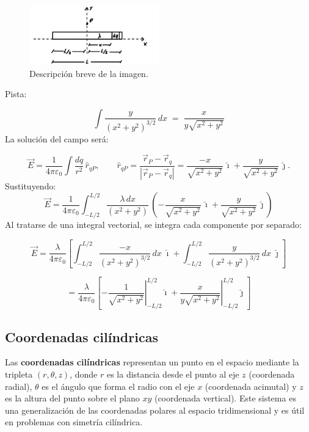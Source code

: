 \documentclass[a4paper,12pt]{article}
\begin{document}
\begin{figure}[h]
  \centering
  \includegraphics[width=0.5\textwidth]{imagen_4.jpeg}
  \caption{Descripción breve de la imagen.}
  \label{fig:imagen4}
\end{figure}

\noindent Pista: 

\[
\int \frac{y}{(x^2+y^2)^{3/2}}\,dx \;=\; \frac{x}{y\sqrt{x^2+y^2}}
\]
La solución del campo será:

\[
\vec E = \frac{1}{4\pi\varepsilon_0} \int \frac{dq}{r^2}\,\hat r_{qP},
\qquad
\hat r_{qP} = \frac{\vec r_P-\vec r_q}{|\vec r_P-\vec r_q|}
= \frac{-x}{\sqrt{x^2+y^2}}\,\hat{\imath} + \frac{y}{\sqrt{x^2+y^2}}\,\hat{\jmath}.
\]
Sustituyendo:
\[
\vec E = \frac{1}{4\pi\varepsilon_0} \int_{-L/2}^{L/2}
\frac{\lambda\,dx}{(x^2+y^2)}\,
\left( -\frac{x}{\sqrt{x^2+y^2}}\,\hat{\imath}
+ \frac{y}{\sqrt{x^2+y^2}}\,\hat{\jmath} \right)
\]
Al tratarse de una integral vectorial, se integra cada componente por separado:

\[
\vec E =
\frac{\lambda}{4\pi\varepsilon_0} \left[
\int_{-L/2}^{L/2} \frac{-x}{(x^2+y^2)^{3/2}}\,dx \;\hat{\imath}
+ \int_{-L/2}^{L/2} \frac{y}{(x^2+y^2)^{3/2}}\,dx \;\hat{\jmath}
\right]
\]

\[
= \frac{\lambda}{4\pi\varepsilon_0} \left[
\left. -\frac{1}{\sqrt{x^2+y^2}} \right|_{-L/2}^{L/2} \hat{\imath}
+ \left. \frac{x}{y\sqrt{x^2+y^2}} \right|_{-L/2}^{L/2} \hat{\jmath}
\right]
\]


\newpage
\subsection{Coordenadas cilíndricas}

\noindent Las \textbf{coordenadas cilíndricas} representan un punto en el espacio mediante la tripleta
 $(r,\theta,z)$, donde $r$ es la distancia desde el punto al eje $z$ (coordenada radial),
  $\theta$ es el ángulo que forma el radio con el eje $x$ (coordenada acimutal) y $z$ es la
   altura del punto sobre el plano $xy$ (coordenada vertical). Este sistema es una generalización
    de las coordenadas polares al espacio tridimensional y es útil en problemas con simetría cilíndrica.\\
\end{document}
